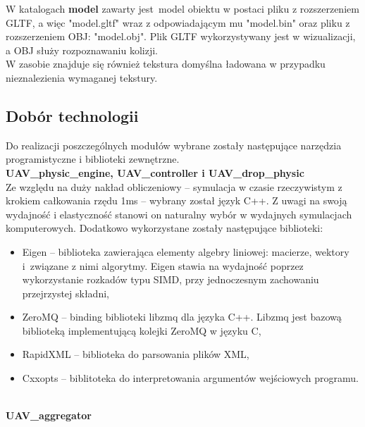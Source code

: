 \documentclass[15pt]{sprawozdanie}
\begin{document}
W katalogach \textbf{model} zawarty jest model obiektu w postaci pliku z rozszerzeniem GLTF, a więc "model.gltf" wraz z odpowiadającym mu "model.bin" oraz pliku z rozszerzeniem OBJ: "model.obj". Plik GLTF wykorzystywany jest w wizualizacji, a OBJ służy rozpoznawaniu kolizji.\\


W zasobie znajduje się również tekstura domyślna ładowana w przypadku nieznalezienia wymaganej tekstury.\\


\newpage


\subsection{Dobór technologii} \label{technologies}

Do realizacji poszczególnych modułów wybrane zostały następujące narzędzia programistyczne i biblioteki zewnętrzne.\\


\textbf{UAV\_physic\_engine, UAV\_controller i UAV\_drop\_physic}\\

Ze względu na duży nakład obliczeniowy -- symulacja w czasie rzeczywistym z krokiem całkowania rzędu 1ms -- wybrany został język C++. Z uwagi na swoją wydajność i elastyczność stanowi on naturalny wybór w wydajnych symulacjach komputerowych. Dodatkowo wykorzystane zostały następujące biblioteki:
\begin{itemize}[noitemsep,nolistsep]
	\item Eigen -- biblioteka zawierająca elementy algebry liniowej: macierze, wektory i~związane z nimi algorytmy. Eigen stawia na wydajność poprzez wykorzystanie rozkadów typu SIMD, przy 		jednoczesnym zachowaniu przejrzystej składni,
	\item ZeroMQ -- binding biblioteki libzmq dla języka C++. Libzmq jest bazową biblioteką implementującą kolejki ZeroMQ w języku C,
	\item RapidXML -- biblioteka do parsowania plików XML,
	\item Cxxopts -- biblitoteka do interpretowania argumentów wejściowych programu.
\end{itemize}
\  \\
\textbf{UAV\_aggregator}\\
\end{document}
